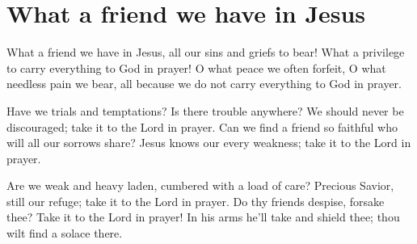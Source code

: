 \starttocol
\chapter{What a friend we have in Jesus}
\nexttocol
\hfill{\it }
\stoptocol
\starttocol
\startlines
{\sc What} a friend we have in Jesus, 
	all our sins and griefs to bear! 
	What a privilege to carry 
	everything to God in prayer! 
	O what peace we often forfeit,
	O what needless pain we bear, 
	all because we do not carry 
	everything to God in prayer. 

	Have we trials and temptations? 
	Is there trouble anywhere? 
	We should never be discouraged; 
	take it to the Lord in prayer. 
	Can we find a friend so faithful 
	who will all our sorrows share? 
	Jesus knows our every weakness; 
	take it to the Lord in prayer. 

	Are we weak and heavy laden, 
	cumbered with a load of care? 
	Precious Savior, still our refuge; 
	take it to the Lord in prayer. 
	Do thy friends despise, forsake thee? 
	Take it to the Lord in prayer! 
	In his arms he'll take and shield thee; 
	thou wilt find a solace there.

\stoplines
\nexttocol

\stoptocol
